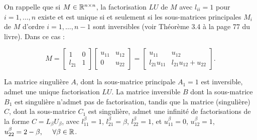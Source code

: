 On rappelle que si $M \in \mathbb{R}^{n \times n}$, la factorisation $LU$ de $M$ avec $l_{ii} = 1$ pour $i = 1, \dots , n$ existe et est unique si et seulement si les sous-matrices principales $M_{i}$ de $M$ d'ordre $i = 1, \dots , n - 1$ sont inversibles (voir Théorème 3.4 à la page 77 du livre).
Dans ce cas :

\begin{equation*}
  M = \begin{bmatrix}
        1       & 0   \\
        l_{21}  & 1
      \end{bmatrix}
      \begin{bmatrix}
        u_{11} & u_{12}   \\
        0      & u_{22}
      \end{bmatrix}
  =
      \begin{bmatrix}
        u_{11}          & u_{12}   \\
        l_{21} u_{11}   & l_{21} u_{12} + u_{22}
      \end{bmatrix}
  .
\end{equation*}

La matrice singulière $A$, dont la sous-matrice principale $A_{1} = 1$ est inversible, admet une unique factorisation $LU$.
La matrice inversible $B$ dont la sous-matrice $B_{1}$ est singulière n'admet pas de factorisation,
tandis que la matrice (singulière) $C$, dont la sous-matrice $C_{1}$ est singulière, admet une infinité de factorisations de la forme $C = L_{\beta} U_{\beta}$,
avec $l^{\beta}_{11} = 1$, $l^{\beta}_{21} = \beta$, $l^{\beta}_{22} = 1$, et $u^{\beta}_{11} = 0$, $u^{\beta}_{12} = 1$, $u^{\beta}_{22} = 2 - \beta, \ \quad \forall \beta \in \mathbb{R}$.